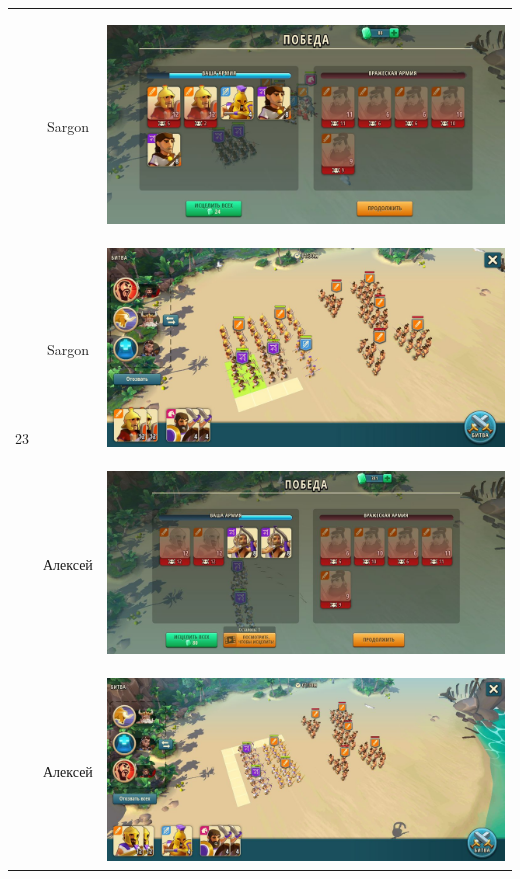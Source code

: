 \begin{longtable}{|c|c|c|}
	\hline
	\multirow{6}{*}{23} & Sargon &
	\hypertarget{fight23}{\includegraphics[width=0.75\linewidth]{./parts/media/TreasureHunt/23/sargon/photo_2022-04-06_18-12-26.jpg}} \\
	& Sargon &
	\includegraphics[width=0.75\linewidth]{./parts/media/TreasureHunt/23/sargon/photo_2022-04-06_18-12-18.jpg} \\
	\hline
	\multirow{6}{*}{23} & Алексей &
	\hypertarget{fight23}{\includegraphics[width=0.75\linewidth]{./parts/media/TreasureHunt/23/alexey/photo_2022-04-13_19-01-32.jpg}} \\
	& Алексей &
	\includegraphics[width=0.75\linewidth]{./parts/media/TreasureHunt/23/alexey/photo_2022-04-13_19-01-54.jpg} \\

\end{longtable}
